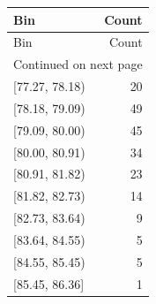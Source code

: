 \begin{longtable}{lr}
\toprule
Bin & Count \\
\midrule
\endfirsthead
\toprule
Bin & Count \\
\midrule
\endhead
\midrule
\multicolumn{2}{r}{Continued on next page} \\
\midrule
\endfoot
\bottomrule
\endlastfoot
{[77.27, 78.18)} & 20 \\
{[78.18, 79.09)} & 49 \\
{[79.09, 80.00)} & 45 \\
{[80.00, 80.91)} & 34 \\
{[80.91, 81.82)} & 23 \\
{[81.82, 82.73)} & 14 \\
{[82.73, 83.64)} & 9 \\
{[83.64, 84.55)} & 5 \\
{[84.55, 85.45)} & 5 \\
{[85.45, 86.36]} & 1 \\
\end{longtable}
